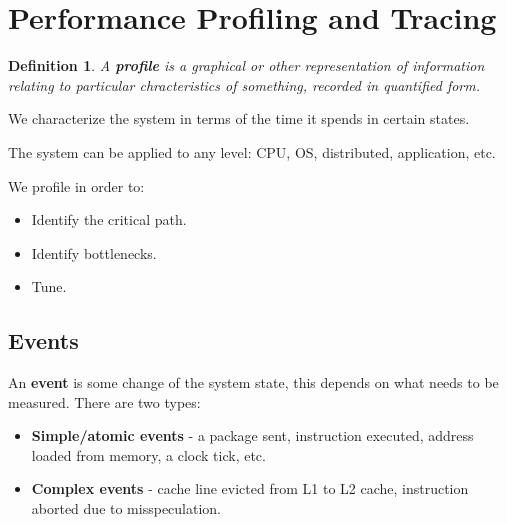 \documentclass[11pt]{article}
\newtheorem{defn}{Definition}
\begin{document}
\section{Performance Profiling and Tracing}
\begin{defn}
  A \textbf{profile} is a graphical or other representation of information relating to particular chracteristics of something, recorded in quantified form.
\end{defn}
We characterize the system in terms of the time it spends in certain states.

The system can be applied to any level: CPU, OS, distributed, application, etc.

We profile in order to:
\begin{itemize}
  \item Identify the critical path.
  \item Identify bottlenecks.
  \item Tune.
\end{itemize}

\subsection{Events}
An \textbf{event} is some change of the system state, this depends on what needs to be measured.
There are two types:
\begin{itemize}
  \item \textbf{Simple/atomic events} - a package sent, instruction executed, address loaded from memory, a clock tick, etc.
  \item \textbf{Complex events} - cache line evicted from L1 to L2 cache, instruction aborted due to misspeculation.
\end{itemize}
\end{document}
